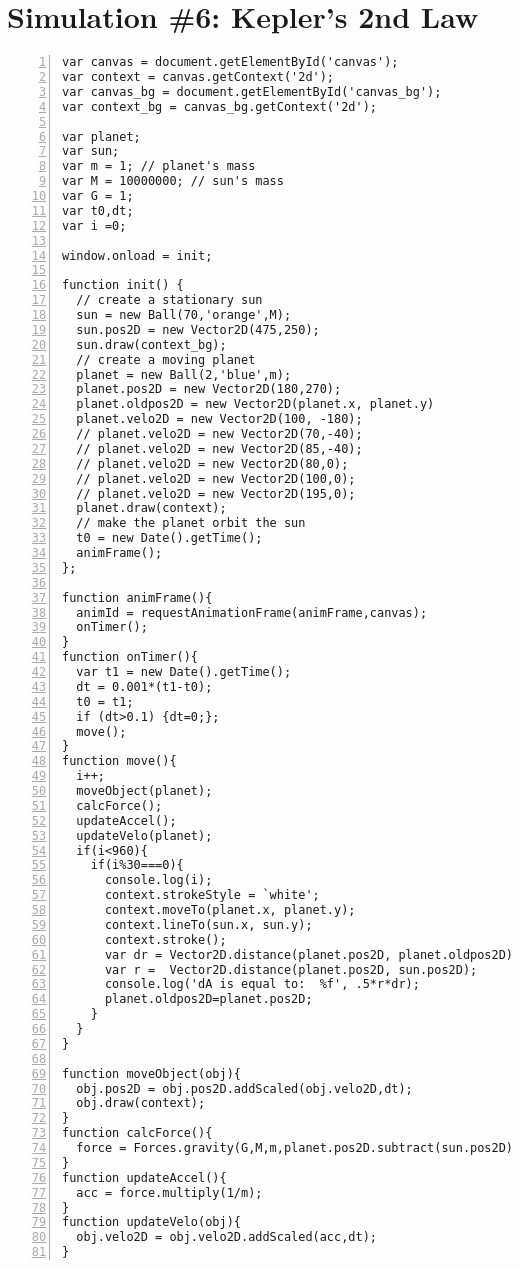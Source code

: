 \section{Simulation \#6:  Kepler's 2nd Law}
\begin{lstlisting}[breaklines=true, frame=single, numbers=left, caption=Kepler's 2nd Law Simulation]
var canvas = document.getElementById('canvas');
var context = canvas.getContext('2d'); 
var canvas_bg = document.getElementById('canvas_bg');
var context_bg = canvas_bg.getContext('2d');

var planet;
var sun;
var m = 1; // planet's mass
var M = 10000000; // sun's mass
var G = 1;
var t0,dt;
var i =0;

window.onload = init; 

function init() {
  // create a stationary sun
  sun = new Ball(70,'orange',M);
  sun.pos2D = new Vector2D(475,250);  
  sun.draw(context_bg);
  // create a moving planet     
  planet = new Ball(2,'blue',m);
  planet.pos2D = new Vector2D(180,270);
  planet.oldpos2D = new Vector2D(planet.x, planet.y)
  planet.velo2D = new Vector2D(100, -180);
  // planet.velo2D = new Vector2D(70,-40);
  // planet.velo2D = new Vector2D(85,-40);
  // planet.velo2D = new Vector2D(80,0);
  // planet.velo2D = new Vector2D(100,0);
  // planet.velo2D = new Vector2D(195,0);   
  planet.draw(context);
  // make the planet orbit the sun
  t0 = new Date().getTime(); 
  animFrame();
};

function animFrame(){
  animId = requestAnimationFrame(animFrame,canvas);
  onTimer(); 
}
function onTimer(){
  var t1 = new Date().getTime(); 
  dt = 0.001*(t1-t0); 
  t0 = t1;  
  if (dt>0.1) {dt=0;};  
  move();
}
function move(){    
  i++;
  moveObject(planet);
  calcForce();
  updateAccel();
  updateVelo(planet);
  if(i<960){
    if(i%30===0){
      console.log(i);
      context.strokeStyle = `white';
      context.moveTo(planet.x, planet.y);
      context.lineTo(sun.x, sun.y);
      context.stroke();
      var dr = Vector2D.distance(planet.pos2D, planet.oldpos2D);
      var r =  Vector2D.distance(planet.pos2D, sun.pos2D);
      console.log('dA is equal to:  %f', .5*r*dr);
      planet.oldpos2D=planet.pos2D;
    }
  }
}

function moveObject(obj){
  obj.pos2D = obj.pos2D.addScaled(obj.velo2D,dt); 
  obj.draw(context);  
}
function calcForce(){
  force = Forces.gravity(G,M,m,planet.pos2D.subtract(sun.pos2D)); 
} 
function updateAccel(){
  acc = force.multiply(1/m);
} 
function updateVelo(obj){
  obj.velo2D = obj.velo2D.addScaled(acc,dt);        
}
\end{lstlisting}

